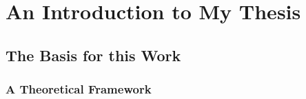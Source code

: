 
\chapter{An Introduction to My Thesis}
\label{cha:intro}

\section{The Basis for this Work}
\label{sec:basis}

\subsection{A Theoretical Framework}
\label{sec:framework}


